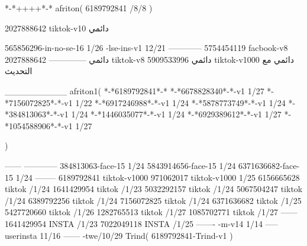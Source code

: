 *-*++++*-*
afriton(
6189792841 /8/8
)

2027888642 tiktok-v10
دائمي

565856296-in-no-se-16 1/26
-lse-ins-v1 12/21
------------
5754454119 facbook-v8
دائمي
--------------
2027888642 tiktok-v8
دائمي
5909533996 tiktok-v1000
دائمي مع التحديث

__________
afriton1(
*-*6189792841*-*
*-*6678828340*-*-v1 1/27
*-*7156072825*-*-v1 1/22
*-*6917246988*-*-v1 1/24
*-*5878773749*-*-v1 1/24
*-*384813063*-*-v1 1/24
*-*1446035077*-*-v1 1/24
*-*6929389612*-*-v1 1/27
*-*1054588906*-*-v1 1/27

)

------
------------
384813063-face-15 1/24
5843914656-face-15 1/24
6371636682-face-15 1/24
--------
6189792841 tiktok-v1000
971062017 tiktok-v1000 1/25
6156665628 tiktok /1/24
1641429954 tiktok /1/23
5032292157 tiktok /1/24
5067504247 tiktok /1/24
6389792256 tiktok /1/24
7156072825 tiktok /1/24
6371636682 tiktok /1/25
5427720660 tiktok /1/26
1282765513 tiktok /1/27
1085702771 tiktok /1/27
------
1641429954 INSTA /1/23
7022049118 INSTA /1/25
-------
-m-v14 1/14
-----
userinsta 11/16
------
-twe/10/29
Trind(
6189792841-Trind-v1 
)
